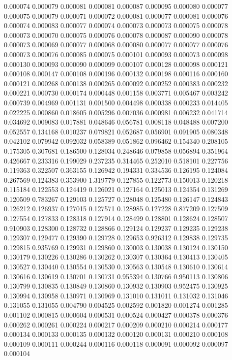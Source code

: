 0.000074
0.000079
0.000081
0.000081
0.000087
0.000095
0.000080
0.000077
0.000075
0.000079
0.000071
0.000072
0.000081
0.000077
0.000081
0.000076
0.000074
0.000083
0.000077
0.000074
0.000073
0.000073
0.000075
0.000078
0.000073
0.000070
0.000075
0.000076
0.000078
0.000087
0.000090
0.000078
0.000073
0.000069
0.000077
0.000068
0.000080
0.000077
0.000077
0.000076
0.000073
0.000076
0.000085
0.000075
0.000101
0.000093
0.000073
0.000098
0.000130
0.000093
0.000090
0.000099
0.000107
0.000128
0.000098
0.000121
0.000108
0.000147
0.000108
0.000196
0.000132
0.000198
0.000116
0.000160
0.000121
0.000268
0.000138
0.000265
0.000092
0.000252
0.000383
0.000232
0.000221
0.000730
0.000174
0.000448
0.001158
0.003771
0.005467
0.003242
0.000739
0.004969
0.001131
0.001500
0.004498
0.000338
0.000233
0.014405
0.022225
0.000860
0.018605
0.005296
0.007036
0.000981
0.006232
0.041714
0.034692
0.009083
0.017881
0.048646
0.056781
0.008118
0.048488
0.007200
0.052557
0.134168
0.010237
0.079821
0.052687
0.056901
0.091905
0.080348
0.042102
0.079942
0.092032
0.058389
0.051862
0.096462
0.154340
0.208105
0.175305
0.307681
0.186500
0.128034
0.248646
0.079858
0.056894
0.351964
0.426667
0.233316
0.199029
0.237235
0.314465
0.252010
0.518101
0.227756
0.119363
0.322507
0.363155
0.126942
0.194331
0.334536
0.126195
0.124084
0.267569
0.124383
0.353900
1.319779
0.127855
0.122773
0.150013
0.120218
0.115184
0.122553
0.124419
0.126021
0.127164
0.125013
0.124354
0.131269
0.120509
0.783267
0.129103
0.125727
0.128048
0.125480
0.126147
0.124843
0.126212
0.126937
0.127015
0.127571
0.128985
0.127228
0.877209
0.127509
0.127554
0.127833
0.128318
0.127914
0.128499
0.128801
0.128624
0.128507
0.910903
0.128300
0.128732
0.128866
0.129124
0.129237
0.129235
0.129238
0.129307
0.129477
0.129390
0.129728
0.129653
0.926312
0.129838
0.129735
0.129815
0.935769
0.129931
0.129860
0.130003
0.130038
0.130124
0.130150
0.130179
0.130226
0.130286
0.130262
0.130307
0.130364
0.130413
0.130405
0.130527
0.130440
0.130554
0.130530
0.130563
0.130548
0.130610
0.130614
0.130616
0.130619
0.130701
0.130731
0.955394
0.130766
0.950113
0.130806
0.130799
0.130835
0.130849
0.130860
0.130932
0.130903
0.952475
0.130925
0.130994
0.130958
0.130971
0.130969
0.131010
0.131011
0.131032
0.131046
0.131055
0.131055
0.004790
0.004525
0.002592
0.001820
0.001274
0.001285
0.001102
0.000815
0.000604
0.000531
0.000524
0.000427
0.000378
0.000376
0.000262
0.000261
0.000224
0.000217
0.000209
0.000210
0.000214
0.000177
0.000134
0.000133
0.000135
0.000132
0.000120
0.000131
0.000210
0.000108
0.000109
0.000111
0.000244
0.000116
0.000118
0.000091
0.000092
0.000097
0.000104

